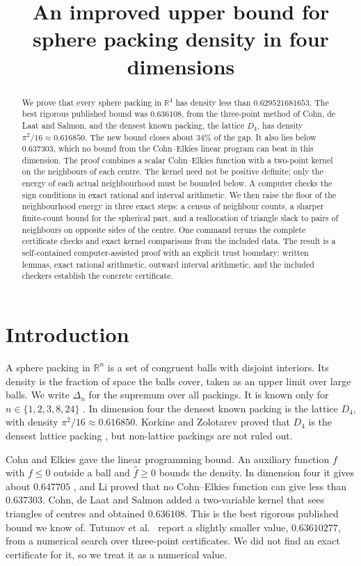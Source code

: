 \documentclass[11pt]{amsart}
\title{An improved upper bound for sphere packing density in four dimensions}
\numberwithin{equation}{section}
\theoremstyle{remark}
\newcommand{\R}{\mathbb{R}}
\begin{document}
\begin{abstract}
We prove that every sphere packing in $\R^4$ has density less than $0.629521681653$. The best rigorous published bound was $0.636108$, from the three-point method of Cohn, de Laat and Salmon, and the densest known packing, the lattice $D_4$, has density $\pi^2/16\approx0.616850$. The new bound closes about $34\%$ of the gap. It also lies below $0.637303$, which no bound from the Cohn--Elkies linear program can beat in this dimension. The proof combines a scalar Cohn--Elkies function with a two-point kernel on the neighbours of each centre. The kernel need not be positive definite; only the energy of each actual neighbourhood must be bounded below. A computer checks the sign conditions in exact rational and interval arithmetic. We then raise the floor of the neighbourhood energy in three exact steps: a census of neighbour counts, a sharper finite-count bound for the spherical part, and a reallocation of triangle slack to pairs of neighbours on opposite sides of the centre. One command reruns the complete certificate checks and exact kernel comparisons from the included data. The result is a self-contained computer-assisted proof with an explicit trust boundary: written lemmas, exact rational arithmetic, outward interval arithmetic, and the included checkers establish the concrete certificate.
\end{abstract}

\maketitle

\section{Introduction}

A sphere packing in $\R^n$ is a set of congruent balls with disjoint interiors. Its density is the fraction of space the balls cover, taken as an upper limit over large balls. We write $\Delta_n$ for the supremum over all packings. It is known only for $n\in\{1,2,3,8,24\}$ \cite{Thue,FejesToth,Hales,Viazovska,CKMRV}. In dimension four the densest known packing is the lattice $D_4$, with density $\pi^2/16\approx0.616850$. Korkine and Zolotarev proved that $D_4$ is the densest lattice packing \cite{KZ}, but non-lattice packings are not ruled out.

Cohn and Elkies \cite{CE} gave the linear programming bound. An auxiliary function $f$ with $f\le0$ outside a ball and $\hat f\ge0$ bounds the density. In dimension four it gives about $0.647705$ \cite[Table~1.1]{CdLS}, and Li \cite{Li} proved that no Cohn--Elkies function can give less than $0.637303$. Cohn, de Laat and Salmon \cite{CdLS} added a two-variable kernel that sees triangles of centres and obtained $0.636108$. This is the best rigorous published bound we know of. Tutunov et al.\ \cite{Tutunov} report a slightly smaller value, $0.63610277$, from a numerical search over three-point certificates. We did not find an exact certificate for it, so we treat it as a numerical value.
\end{document}
